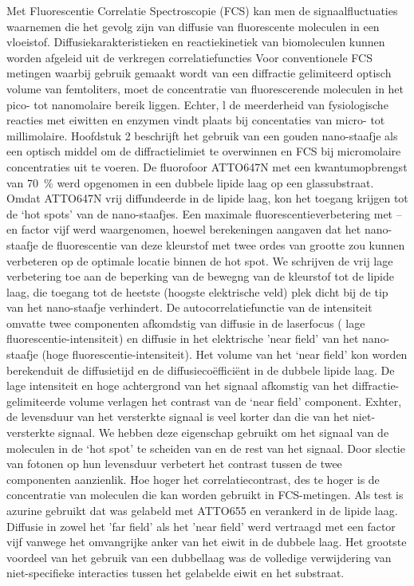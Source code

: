 Met Fluorescentie Correlatie Spectroscopie (FCS) kan men de signaalfluctuaties waarnemen die het gevolg zijn van diffusie van fluorescente moleculen in een vloeistof. Diffusiekarakteristieken en reactiekinetiek van biomoleculen kunnen worden afgeleid uit de verkregen correlatiefuncties Voor conventionele FCS metingen waarbij gebruik gemaakt wordt van een diffractie gelimiteerd optisch volume van femtoliters, moet de concentratie
van fluorescerende moleculen in het pico- tot nanomolaire bereik liggen. Echter, l de meerderheid van fysiologische reacties met eiwitten en enzymen vindt plaats bij concentaties van micro- tot millimolaire.  Hoofdstuk 2 beschrijft het gebruik van een gouden nano-staafje als een optisch middel  om de diffractielimiet te overwinnen en FCS bij micromolaire concentraties uit te voeren. De fluorofoor ATTO647N met een kwantumopbrengst van \SI{70}{\percent} werd opgenomen in een dubbele lipide laag op een glassubstraat. Omdat ATTO647N vrij diffundeerde in de lipide laag, kon het toegang krijgen tot de ‘hot spots’ van de nano-staafjes. Een maximale fluorescentieverbetering met –en factor vijf werd waargenomen, hoewel berekeningen aangaven dat het nano-staafje de fluorescentie van deze kleurstof met twee ordes van grootte zou kunnen verbeteren op de optimale locatie binnen de hot spot. We schrijven de vrij lage verbetering toe aan de beperking van de bewegng van de kleurstof tot de lipide laag, die toegang tot de heetste (hoogste elektrische veld) plek dicht bij de tip van het nano-staafje verhindert. De autocorrelatiefunctie van de intensiteit omvatte twee componenten afkomdstig van diffusie in de laserfocus ( lage fluorescentie-intensiteit) en diffusie in het elektrische ’near field’  van het nano-staafje (hoge fluorescentie-intensiteit). Het volume van het ‘near field’ kon worden berekenduit de diffusietijd en de diffusiecoëfficiënt in de dubbele lipide laag. De lage intensiteit en hoge achtergrond van  het signaal afkomstig van het diffractie-gelimiteerde volume verlagen het contrast van de ‘near field’ component. Exhter, de levensduur van het versterkte signaal is veel korter dan die van het niet-versterkte signaal. We hebben deze eigenschap gebruikt om het signaal van de moleculen in de ‘hot spot’ te scheiden van en de rest van het signaal. Door slectie van fotonen op hun levensduur verbetert het contrast tussen de twee componenten aanzienlik. Hoe hoger het correlatiecontrast, des te hoger is de concentratie van moleculen die kan worden gebruikt in FCS-metingen. Als test is azurine gebruikt dat was gelabeld met ATTO655 en verankerd in de lipide laag. Diffusie in zowel het ’far field’  als het ’near field’ werd vertraagd met een factor vijf vanwege het omvangrijke anker van het eiwit in de dubbele laag. Het grootste voordeel van het gebruik van een dubbellaag was de volledige verwijdering van niet-specifieke interacties tussen het gelabelde eiwit en het substraat.
 


